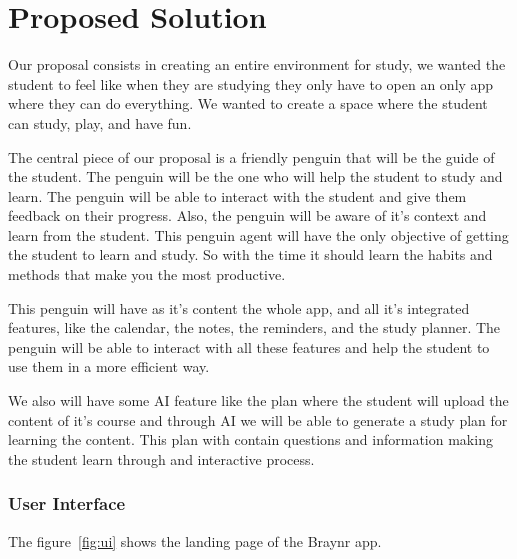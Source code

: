 \documentclass{report}
\begin{document}
\section{Proposed Solution}

Our proposal consists in creating an entire environment for study, we wanted the student to feel like when they are studying they only have to open an only app where they can do everything. We wanted to create a space where the student can study, play, and have fun. 

The central piece of our proposal is a friendly penguin that will be the guide of the student. The penguin will be the one who will help the student to study and learn. The penguin will be able to interact with the student and give them feedback on their progress. Also, the penguin will be aware of it's context and learn from the student. This penguin agent will have the only objective of getting the student to learn and study. So with the time it should learn the habits and methods that make you the most productive.

This penguin will have as it's content the whole app, and all it's integrated features, like the calendar, the notes, the reminders, and the study planner. The penguin will be able to interact with all these features and help the student to use them in a more efficient way.

We also will have some AI feature like the plan where the student will upload the content of it's course and through AI we will be able to generate a study plan for learning the content. This plan with contain questions and information making the student learn through and interactive process.



\subsubsection{User Interface}

The figure~\ref{fig:ui} shows the landing page of the Braynr app.
\end{document}
